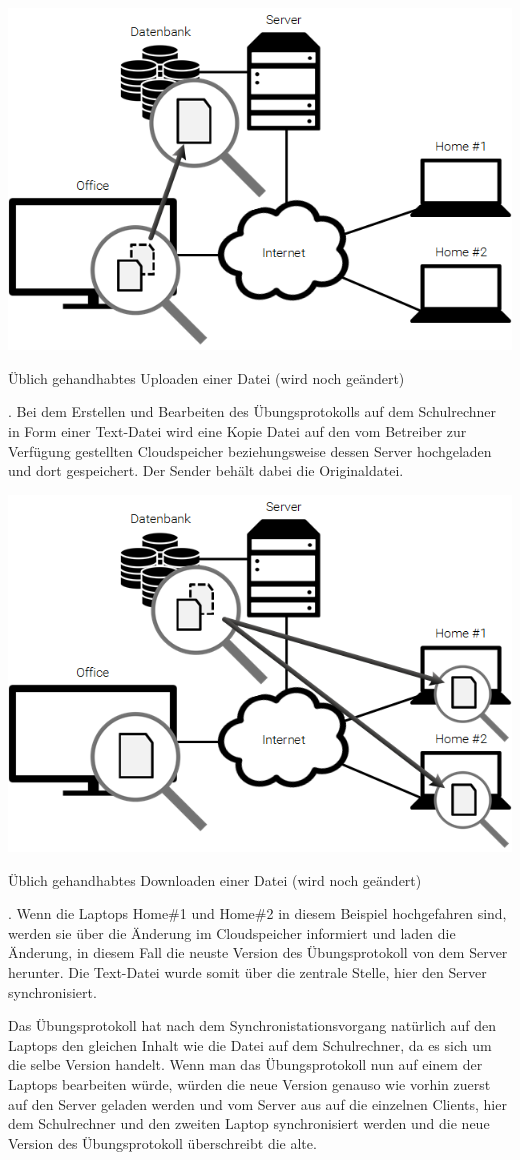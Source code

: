 \includegraphics[]{images/Dropbox_1}
\caption{Üblich gehandhabtes Uploaden einer Datei (wird noch geändert)}.
Bei dem Erstellen und Bearbeiten des Übungsprotokolls auf dem Schulrechner in Form
einer Text-Datei wird eine Kopie Datei auf den vom Betreiber zur Verfügung gestellten
Cloudspeicher beziehungsweise dessen Server hochgeladen und dort gespeichert.
Der Sender behält dabei die Originaldatei.

\includegraphics[]{images/Dropbox_2}
\caption{Üblich gehandhabtes Downloaden einer Datei (wird noch geändert)}.
Wenn die Laptops Home\#1 und Home\#2 in diesem Beispiel hochgefahren sind, werden
sie über die Änderung im Cloudspeicher informiert und laden die Änderung, in
diesem Fall die neuste Version des Übungsprotokoll von dem Server herunter.
Die Text-Datei wurde somit über die zentrale Stelle, hier den Server synchronisiert.

Das Übungsprotokoll hat nach dem Synchronistationsvorgang natürlich auf den Laptops
den gleichen Inhalt wie die Datei auf dem Schulrechner, da es sich um die selbe Version
handelt. Wenn man das Übungsprotokoll nun auf einem der Laptops bearbeiten würde, würden
die neue Version genauso wie vorhin zuerst auf den Server geladen werden und vom Server
aus auf die einzelnen Clients, hier dem Schulrechner und den zweiten Laptop synchronisiert
werden und die neue Version des Übungsprotokoll überschreibt die alte.
